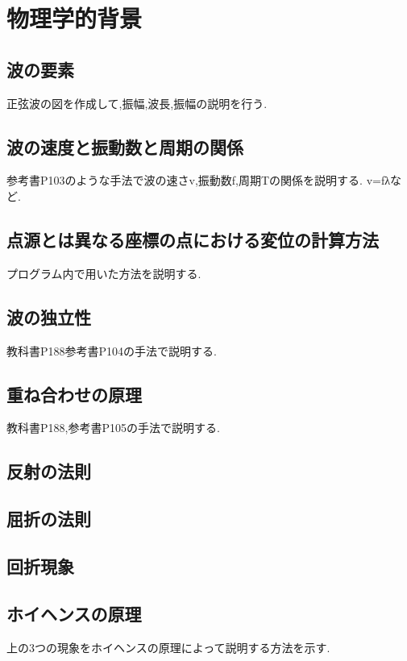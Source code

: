 \chapter{物理学的背景}
\section{波の要素}
正弦波の図を作成して,振幅,波長,振幅の説明を行う.
\section{波の速度と振動数と周期の関係}
参考書P103のような手法で波の速さv,振動数f,周期Tの関係を説明する. v=fλなど.
\section{点源とは異なる座標の点における変位の計算方法}
プログラム内で用いた方法を説明する.

\section{波の独立性}
教科書P188参考書P104の手法で説明する.
\section{重ね合わせの原理}
教科書P188,参考書P105の手法で説明する.
\section{反射の法則}
\section{屈折の法則}
\section{回折現象}
\section{ホイヘンスの原理}
上の3つの現象をホイヘンスの原理によって説明する方法を示す.




















